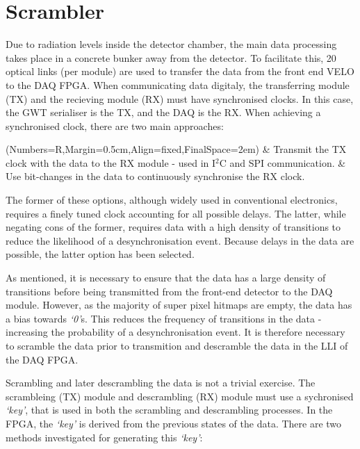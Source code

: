 \section{Scrambler}
\label{sec:scrambling_algorithms}

	Due to radiation levels inside the detector chamber, the main data processing takes place in a concrete bunker away from the detector.
	To facilitate this, 20 optical links (per module) are used to transfer the data from the front end VELO to the DAQ FPGA.
	When communicating data digitaly, the transferring module (TX) and the recieving module (RX) must have synchronised clocks.
	In this case, the GWT serialiser is the TX, and the DAQ is the RX.
	When achieving a synchronised clock, there are two main approaches:

	\begin{easylist}
		\ListProperties(Numbers=R,Margin=0.5cm,Align=fixed,FinalSpace=2em)
		& Transmit the TX clock with the data to the RX module - used in I$^2$C and SPI communication.
		& Use bit-changes in the data to continuously synchronise the RX clock.
	\end{easylist}

	The former of these options, although widely used in conventional electronics, requires a finely tuned clock accounting for all possible delays.
	The latter, while negating cons of the former, requires data with a high density of transitions to reduce the likelihood of a desynchronisation event.
	Because delays in the data are possible, the latter option has been selected.

	As mentioned, it is necessary to ensure that the data has a large density of transitions before being transmitted from the front-end detector to the DAQ module.
	However, as the majority of super pixel hitmaps are empty, the data has a bias towards \textit{`0'}s.
	This reduces the frequency of transitions in the data - increasing the probability of a desynchronisation event.
	It is therefore necessary to scramble the data prior to transmition and descramble the data in the LLI of the DAQ FPGA.
	\par
	Scrambling and later descrambling the data is not a trivial exercise.
	The scrambleing (TX) module and descrambling (RX) module must use a sychronised \textit{`key'}, that is used in both the scrambling and descrambling processes.
	In the FPGA, the \textit{`key'} is derived from the previous states of the data.
	There are two methods investigated for generating this \textit{`key'}:

